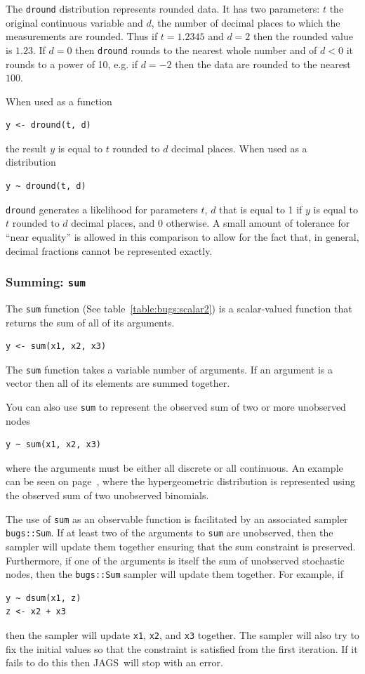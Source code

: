\documentclass[11pt, a4paper, titlepage]{report}
\newcommand{\JAGS}{\textsf{JAGS}}
\begin{document}
{The \texttt{dround} distribution represents rounded data. It has two
parameters: $t$ the original continuous variable and $d$, the number
of decimal places to which the measurements are rounded. Thus if
$t=1.2345$ and $d=2$ then the rounded value is $1.23$. If $d=0$ then
\texttt{dround} rounds to the nearest whole number and of $d < 0$ it
rounds to a power of 10, e.g. if $d=-2$ then the data are rounded to
the nearest $100$.

When used as a function
\begin{verbatim}
y <- dround(t, d)
\end{verbatim}
the result $y$ is equal to $t$ rounded to $d$ decimal places. When
used as a distribution
\begin{verbatim}
y ~ dround(t, d)
\end{verbatim}
\texttt{dround} generates a likelihood for parameters $t$, $d$ that is
equal to 1 if $y$ is equal to $t$ rounded to $d$ decimal places, and 0
otherwise. A small amount of tolerance for ``near equality'' is
allowed in this comparison to allow for the fact that, in general,
decimal fractions cannot be represented exactly.

\subsubsection{Summing: \texttt{sum}}
\label{bugs:sum}

The \texttt{sum} function (See table~\ref{table:bugs:scalar2}) is
a scalar-valued function that returns the sum of all of its arguments.
\begin{verbatim}
y <- sum(x1, x2, x3)
\end{verbatim}
The \texttt{sum} function takes a variable number of arguments. If
an argument is a vector then all of its elements are summed together.

You can also use \texttt{sum} to represent the observed sum of two
or more unobserved nodes
\begin{verbatim}
y ~ sum(x1, x2, x3)
\end{verbatim}
where the arguments must be either all discrete or all continuous.  An
example can be seen on page~\pageref{bugs:dhyper}, where the
hypergeometric distribution is represented using the observed sum of
two unobserved binomials.

The use of \texttt{sum} as an observable function is facilitated by an
associated sampler \texttt{bugs::Sum}. If at least two of the
arguments to \texttt{sum} are unobserved, then the sampler will update
them together ensuring that the sum constraint is preserved.
Furthermore, if one of the arguments is itself the sum of unobserved
stochastic nodes, then the \texttt{bugs::Sum} sampler will update them
together. For example, if
\begin{verbatim}
y ~ dsum(x1, z)
z <- x2 + x3
\end{verbatim}
then the sampler will update {\tt x1}, {\tt x2}, and {\tt x3}
together. The sampler will also try to fix the initial values so that
the constraint is satisfied from the first iteration. If it fails to
do this then \JAGS\ will stop with an error.

}
\end{document}
